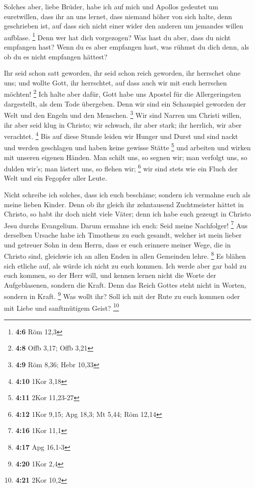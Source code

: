  Solches aber, liebe Brüder, habe ich auf mich und Apollos
gedeutet um euretwillen, dass ihr an uns lernet, dass niemand höher von
sich halte, denn geschrieben ist, auf dass sich nicht einer wider den
anderen um jemandes willen aufblase. \footnote{\textbf{4:6} Röm 12,3}
 Denn wer hat dich vorgezogen? Was hast du aber, dass du
nicht empfangen hast? Wenn du es aber empfangen hast, was rühmst du dich
denn, als ob du es nicht empfangen hättest?

 Ihr seid schon satt geworden, ihr seid schon reich
geworden, ihr herrschet ohne uns; und wollte Gott, ihr herrschtet, auf
dass auch wir mit euch herrschen möchten! \footnote{\textbf{4:8} Offb
  3,17; Offb 3,21}  Ich halte aber dafür, Gott habe uns
Apostel für die Allergeringsten dargestellt, als dem Tode übergeben.
Denn wir sind ein Schauspiel geworden der Welt und den Engeln und den
Menschen. \footnote{\textbf{4:9} Röm 8,36; Hebr 10,33}  Wir
sind Narren um Christi willen, ihr aber seid klug in Christo; wir
schwach, ihr aber stark; ihr herrlich, wir aber verachtet. \footnote{\textbf{4:10}
  1Kor 3,18}  Bis auf diese Stunde leiden wir Hunger und
Durst und sind nackt und werden geschlagen und haben keine gewisse
Stätte \footnote{\textbf{4:11} 2Kor 11,23-27}  und arbeiten
und wirken mit unseren eigenen Händen. Man schilt uns, so segnen wir;
man verfolgt uns, so dulden wir's; man lästert uns, so flehen wir;
\footnote{\textbf{4:12} 1Kor 9,15; Apg 18,3; Mt 5,44; Röm 12,14}
 wir sind stets wie ein Fluch der Welt und ein Fegopfer
aller Leute.

 Nicht schreibe ich solches, dass ich euch beschäme;
sondern ich vermahne euch als meine lieben Kinder.  Denn ob
ihr gleich ihr zehntausend Zuchtmeister hättet in Christo, so habt ihr
doch nicht viele Väter; denn ich habe euch gezeugt in Christo Jesu
durchs Evangelium.  Darum ermahne ich euch: Seid meine
Nachfolger! \footnote{\textbf{4:16} 1Kor 11,1}  Aus
derselben Ursache habe ich Timotheus zu euch gesandt, welcher ist mein
lieber und getreuer Sohn in dem Herrn, dass er euch erinnere meiner
Wege, die in Christo sind, gleichwie ich an allen Enden in allen
Gemeinden lehre. \footnote{\textbf{4:17} Apg 16,1-3}  Es
blähen sich etliche auf, als würde ich nicht zu euch kommen.
 Ich werde aber gar bald zu euch kommen, so der Herr will,
und kennen lernen nicht die Worte der Aufgeblasenen, sondern die Kraft.
 Denn das Reich Gottes steht nicht in Worten, sondern in
Kraft. \footnote{\textbf{4:20} 1Kor 2,4}  Was wollt ihr?
Soll ich mit der Rute zu euch kommen oder mit Liebe und sanftmütigem
Geist? \footnote{\textbf{4:21} 2Kor 10,2}

